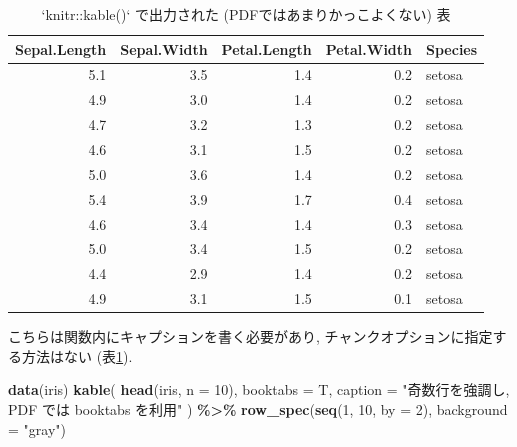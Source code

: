 \documentclass[
  nomag]{bxjsbook}
\newenvironment{Shaded}{\begin{snugshade}}{\end{snugshade}}
\newcommand{\DataTypeTok}[1]{\textcolor[rgb]{0.13,0.29,0.53}{#1}}
\newcommand{\DecValTok}[1]{\textcolor[rgb]{0.00,0.00,0.81}{#1}}
\newcommand{\KeywordTok}[1]{\textcolor[rgb]{0.13,0.29,0.53}{\textbf{#1}}}
\newcommand{\NormalTok}[1]{#1}
\newcommand{\OperatorTok}[1]{\textcolor[rgb]{0.81,0.36,0.00}{\textbf{#1}}}
\newcommand{\StringTok}[1]{\textcolor[rgb]{0.31,0.60,0.02}{#1}}
\theoremstyle{definition}
\theoremstyle{definition}
\theoremstyle{definition}
\theoremstyle{remark}
\begin{document}
\begin{table}

\caption{\label{tab:display-dataframe-kable}`knitr::kable()` で出力された (PDFではあまりかっこよくない) 表}
\centering
\begin{tabular}[t]{r|r|r|r|l}
\hline
Sepal.Length & Sepal.Width & Petal.Length & Petal.Width & Species\\
\hline
5.1 & 3.5 & 1.4 & 0.2 & setosa\\
\hline
4.9 & 3.0 & 1.4 & 0.2 & setosa\\
\hline
4.7 & 3.2 & 1.3 & 0.2 & setosa\\
\hline
4.6 & 3.1 & 1.5 & 0.2 & setosa\\
\hline
5.0 & 3.6 & 1.4 & 0.2 & setosa\\
\hline
5.4 & 3.9 & 1.7 & 0.4 & setosa\\
\hline
4.6 & 3.4 & 1.4 & 0.3 & setosa\\
\hline
5.0 & 3.4 & 1.5 & 0.2 & setosa\\
\hline
4.4 & 2.9 & 1.4 & 0.2 & setosa\\
\hline
4.9 & 3.1 & 1.5 & 0.1 & setosa\\
\hline
\end{tabular}
\end{table}

こちらは関数内にキャプションを書く必要があり,
チャンクオプションに指定する方法はない
(表\ref{tab:display-dataframe-kable}).

\begin{Shaded}
\begin{Highlighting}[numbers=left,,]
\KeywordTok{data}\NormalTok{(iris)}
\KeywordTok{kable}\NormalTok{(}
  \KeywordTok{head}\NormalTok{(iris, }\DataTypeTok{n =} \DecValTok{10}\NormalTok{),}
  \DataTypeTok{booktabs =}\NormalTok{ T,}
  \DataTypeTok{caption =} \StringTok{"奇数行を強調し, PDF では booktabs を利用"}
\NormalTok{) }\OperatorTok{\%\textgreater{}\%}\StringTok{ }\KeywordTok{row\_spec}\NormalTok{(}\KeywordTok{seq}\NormalTok{(}\DecValTok{1}\NormalTok{, }\DecValTok{10}\NormalTok{, }\DataTypeTok{by =} \DecValTok{2}\NormalTok{), }\DataTypeTok{background =} \StringTok{"gray"}\NormalTok{)}
\end{Highlighting}
\end{Shaded}
\end{document}
